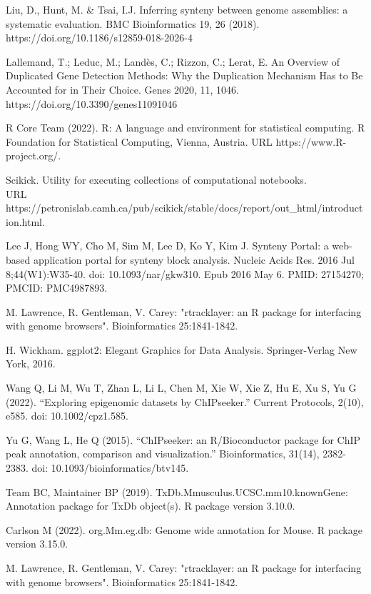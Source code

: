 \documentclass[12pt]{article}
\begin{document}
\begin{thebibliography}{99}
 Liu, D., Hunt, M. \& Tsai, I.J. Inferring synteny between
genome assemblies: a systematic evaluation. BMC Bioinformatics 19, 26 (2018).
https://doi.org/10.1186/s12859-018-2026-4

 Lallemand, T.; Leduc, M.; Landès, C.; Rizzon, C.; Lerat, E.
An Overview of Duplicated Gene Detection Methods: Why the Duplication Mechanism
Has to Be Accounted for in Their Choice. Genes 2020, 11, 1046.
https://doi.org/10.3390/genes11091046

 R Core Team (2022).
R: A language and environment for statistical computing. R Foundation
for Statistical Computing, Vienna, Austria. URL https://www.R-project.org/.

 Scikick. Utility for executing collections of computational
notebooks.\\
URL https://petronislab.camh.ca/pub/scikick/stable/docs/report/out\_html/introduction.html.

 Lee J, Hong WY, Cho M, Sim M, Lee D, Ko Y, Kim J. Synteny
Portal: a web-based application portal for synteny block analysis. Nucleic
Acids Res. 2016 Jul 8;44(W1):W35-40. doi: 10.1093/nar/gkw310. Epub 2016 May 6.
PMID: 27154270; PMCID: PMC4987893.

 M. Lawrence, R. Gentleman, V. Carey: "rtracklayer: an {R}
package for interfacing with genome browsers". Bioinformatics 25:1841-1842.

 H. Wickham. ggplot2: Elegant Graphics for Data Analysis.
Springer-Verlag New York, 2016.

 Wang Q, Li M, Wu T, Zhan L, Li L, Chen M, Xie W, Xie Z, Hu E,
Xu S, Yu G (2022). “Exploring epigenomic datasets by ChIPseeker.” Current
Protocols, 2(10), e585. doi: 10.1002/cpz1.585.

 Yu G, Wang L, He Q (2015). “ChIPseeker: an R/Bioconductor
package for ChIP peak annotation, comparison and visualization.”
Bioinformatics, 31(14), 2382-2383. doi: 10.1093/bioinformatics/btv145.

 Team BC, Maintainer BP (2019).
TxDb.Mmusculus.UCSC.mm10.knownGene: Annotation package for TxDb object(s).
R package version 3.10.0.

 Carlson M (2022). org.Mm.eg.db: Genome wide annotation for
Mouse. R package version 3.15.0.

 M. Lawrence, R. Gentleman, V. Carey: "rtracklayer: an {R}
package for interfacing with genome browsers". Bioinformatics 25:1841-1842.


\end{thebibliography}
\end{document}
